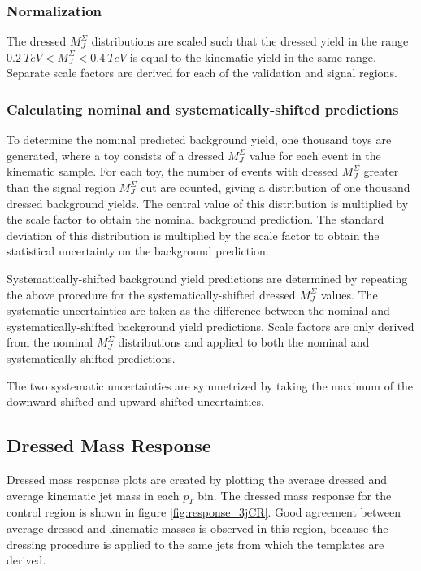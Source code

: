 \subsubsection{Normalization}
The dressed $M_{J}^{\Sigma}$ distributions are scaled such that the
dressed yield in the range  $0.2~TeV < M_{J}^{\Sigma} <
0.4~TeV$ is equal to the kinematic yield in the same range. Separate
scale factors are derived for each of the validation and signal regions.

\subsubsection{Calculating nominal and systematically-shifted
  predictions}
To determine the nominal predicted background yield, one thousand toys
are generated, where a toy consists of a dressed $M_{J}^{\Sigma}$ value for
each event in the kinematic sample. For each toy, the number of events
with dressed $M_{J}^{\Sigma}$ greater than the signal region
$M_{J}^{\Sigma}$ cut are counted, giving a distribution of one
thousand dressed background yields. The central value of this distribution is
multiplied by the scale factor to obtain the nominal background
prediction. The standard deviation of this distribution is multiplied
by the scale factor to obtain the statistical uncertainty on the
background prediction.

Systematically-shifted background yield predictions are determined by repeating
the above procedure for the systematically-shifted dressed
$M_{J}^{\Sigma}$ values. The systematic uncertainties are taken as the
difference between the nominal and systematically-shifted background
yield predictions. Scale factors are only derived from the nominal
$M_{J}^{\Sigma}$ distributions and applied to both the nominal and
systematically-shifted predictions.

The two systematic uncertainties are symmetrized by taking the maximum
of the downward-shifted and upward-shifted uncertainties.

\subsection{Dressed Mass Response} \label{response}
Dressed mass response plots are created by plotting the average
dressed and average kinematic jet mass in each $p_T$ bin. The dressed mass
response for the control region is shown in figure
\ref{fig:response_3jCR}. Good agreement between average dressed and
kinematic masses is observed in this region, because the dressing
procedure is applied to the same jets from which the templates are
derived.

